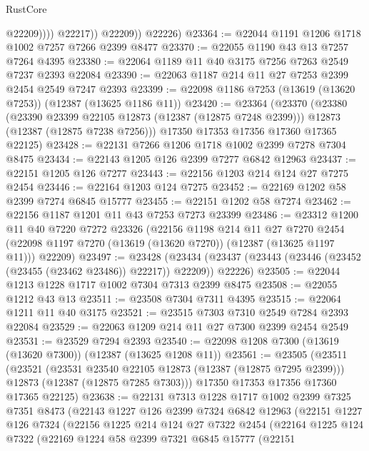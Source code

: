 \begin{lexlean}{RustCore}
\begin{coremodule}
                      @22209))))
              @22217))
          @22209))
      @22226)
@23364 := @22044 @1191 @1206 @1718 @1002 @7257 @7266 @2399 @8477
@23370 := @22055 @1190 @43 @13 @7257 @7264 @4395
@23380 := @22064 @1189 @11 @40 @3175 @7256 @7263 @2549 @7237 @2393 @22084
@23390 := @22063 @1187 @214 @11 @27 @7253 @2399 @2454 @2549 @7247 @2393
@23399 := @22098 @1186 @7253 (@13619 (@13620 @7253)) (@12387 (@13625 @1186 @11))
@23420 := @23364
    (@23370
      (@23380
        (@23390 @23399 @22105 @12873 (@12387 (@12875 @7248 @2399)))
        @12873
        (@12387 (@12875 @7238 @7256)))
      @17350
      @17353
      @17356
      @17360
      @17365
      @22125)
@23428 := @22131 @7266 @1206 @1718 @1002 @2399 @7278 @7304 @8475
@23434 := @22143 @1205 @126 @2399 @7277 @6842 @12963
@23437 := @22151 @1205 @126 @7277
@23443 := @22156 @1203 @214 @124 @27 @7275 @2454
@23446 := @22164 @1203 @124 @7275
@23452 := @22169 @1202 @58 @2399 @7274 @6845 @15777
@23455 := @22151 @1202 @58 @7274
@23462 := @22156 @1187 @1201 @11 @43 @7253 @7273 @23399
@23486 := @23312
    @1200
    @11
    @40
    @7220
    @7272
    @23326
    (@22156
      @1198
      @214
      @11
      @27
      @7270
      @2454
      (@22098 @1197 @7270 (@13619 (@13620 @7270)) (@12387 (@13625 @1197 @11)))
      @22209)
@23497 := @23428
    (@23434 (@23437 (@23443 (@23446 (@23452 (@23455 (@23462 @23486)) @22217)) @22209)) @22226)
@23505 := @22044 @1213 @1228 @1717 @1002 @7304 @7313 @2399 @8475
@23508 := @22055 @1212 @43 @13
@23511 := @23508 @7304 @7311 @4395
@23515 := @22064 @1211 @11 @40 @3175
@23521 := @23515 @7303 @7310 @2549 @7284 @2393 @22084
@23529 := @22063 @1209 @214 @11 @27 @7300 @2399 @2454 @2549
@23531 := @23529 @7294 @2393
@23540 := @22098 @1208 @7300 (@13619 (@13620 @7300)) (@12387 (@13625 @1208 @11))
@23561 := @23505
    (@23511
      (@23521
        (@23531 @23540 @22105 @12873 (@12387 (@12875 @7295 @2399)))
        @12873
        (@12387 (@12875 @7285 @7303)))
      @17350
      @17353
      @17356
      @17360
      @17365
      @22125)
@23638 := @22131
    @7313
    @1228
    @1717
    @1002
    @2399
    @7325
    @7351
    @8473
    (@22143
      @1227
      @126
      @2399
      @7324
      @6842
      @12963
      (@22151
        @1227
        @126
        @7324
        (@22156
          @1225
          @214
          @124
          @27
          @7322
          @2454
          (@22164
            @1225
            @124
            @7322
            (@22169
              @1224
              @58
              @2399
              @7321
              @6845
              @15777
              (@22151

\end{coremodule}
\end{lexlean}
